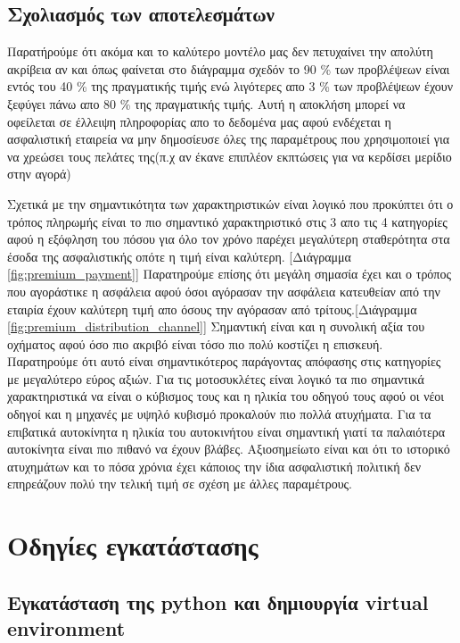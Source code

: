 \documentclass{llncs}
\begin{document}
\subsection{Σχολιασμός των αποτελεσμάτων}
\newpage
Παρατήρούμε ότι ακόμα και το καλύτερο 
μοντέλο μας δεν πετυχαίνει την απολύτη ακρίβεια αν και όπως φαίνεται
στο διάγραμμα σχεδόν το 90 \% των προβλέψεων είναι εντός του 40 \% της πραγματικής τιμής
ενώ λιγότερες απο 3 \% των προβλέψεων έχουν ξεφύγει πάνω απο 80 \% της πραγματικής τιμής.
Αυτή η αποκλήση μπορεί να οφείλεται σε έλλειψη πληροφορίας απο το δεδομένα μας αφού ενδέχεται
η ασφαλιστική εταιρεία να μην δημοσίευσε όλες της παραμέτρους που χρησιμοποιεί για να 
χρεώσει τους πελάτες της(π.χ αν έκανε επιπλέον εκπτώσεις για να κερδίσει μερίδιο στην αγορά)

Σχετικά με την σημαντικότητα των χαρακτηριστικών είναι λογικό που προκύπτει ότι ο τρόπος πληρωμής 
είναι το πιο σημαντικό χαρακτηριστικό στις 3 απο τις 4 κατηγορίες αφού η εξόφληση του πόσου
για όλο τον χρόνο παρέχει μεγαλύτερη σταθερότητα στα έσοδα της ασφαλιστικής οπότε η τιμή είναι
καλύτερη. [Διάγραμμα \ref{fig:premium_payment}]
Παρατηρούμε επίσης ότι μεγάλη σημασία έχει και ο τρόπος που αγοράστικε η ασφάλεια αφού 
όσοι αγόρασαν την ασφάλεια κατευθείαν από την εταιρία έχουν καλύτερη τιμή απο όσους την 
αγόρασαν από τρίτους.[Διάγραμμα \ref{fig:premium_distribution_channel}]
Σημαντική είναι και η συνολική αξία του οχήματος αφού όσο πιο ακριβό είναι τόσο πιο πολύ
κοστίζει η επισκευή. Παρατηρούμε ότι αυτό είναι σημαντικότερος παράγοντας απόφασης στις
κατηγορίες με μεγαλύτερο εύρος αξιών.
Για τις μοτοσυκλέτες είναι λογικό 
τα πιο σημαντικά χαρακτηριστικά να είναι ο κύβισμος τους και η ηλικία του οδηγού τους αφού
οι νέοι οδηγοί και η μηχανές με υψηλό κυβισμό προκαλούν πιο πολλά ατυχήματα.
Για τα επιβατικά αυτοκίνητα η ηλικία του αυτοκινήτου είναι σημαντική γιατί τα παλαιότερα αυτοκίνητα
είναι πιο πιθανό να έχουν βλάβες.
Αξιοσημείωτο είναι και ότι το ιστορικό ατυχημάτων και το πόσα χρόνια έχει κάποιος την 
ίδια ασφαλιστική πολιτική δεν επηρεάζουν πολύ την τελική τιμή 
σε σχέση με άλλες παραμέτρους.

\section{Οδηγίες εγκατάστασης}

\subsection{Εγκατάσταση της python και δημιουργία virtual environment}
\end{document}

